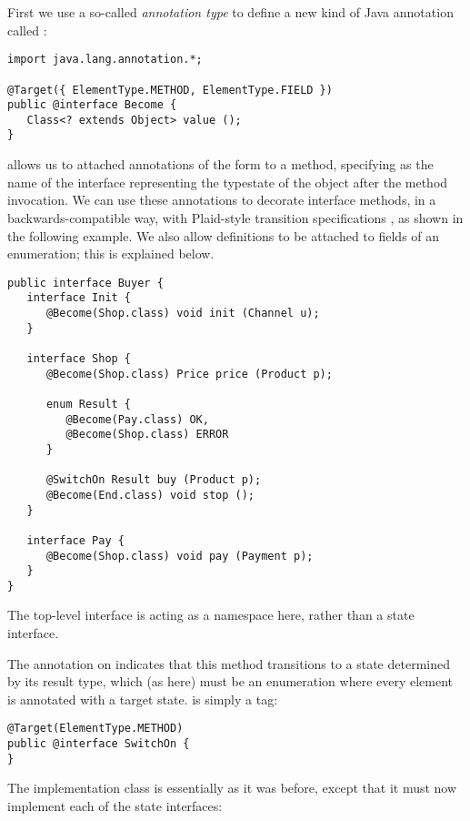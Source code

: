 First we use a so-called \emph{annotation type} to define a new kind
of Java annotation called :

\begin{lstlisting}
import java.lang.annotation.*;

@Target({ ElementType.METHOD, ElementType.FIELD })
public @interface Become {
   Class<? extends Object> value ();
}
\end{lstlisting}

\noindent {} allows us to attached annotations of the form
 to a method, specifying  as the
name of the interface representing the typestate of the object after
the method invocation. We can use these annotations to decorate
interface methods, in a backwards-compatible way, with Plaid-style
transition specifications \cite{garcia14}, as shown in the following
example. We also allow  definitions to be attached to
fields of an enumeration; this is explained below.

\begin{lstlisting}
public interface Buyer {
   interface Init {
      @Become(Shop.class) void init (Channel u);
   }

   interface Shop {
      @Become(Shop.class) Price price (Product p);

      enum Result {
         @Become(Pay.class) OK,
         @Become(Shop.class) ERROR
      }

      @SwitchOn Result buy (Product p);
      @Become(End.class) void stop ();
   }

   interface Pay {
      @Become(Shop.class) void pay (Payment p);
   }
}
\end{lstlisting}

\noindent The top-level  interface is acting as a
namespace here, rather than a state interface.

The  annotation on  indicates that this method
transitions to a state determined by its result type, which (as here)
must be an enumeration where every element is annotated with a target
state.  is simply a tag:
\begin{lstlisting}
@Target(ElementType.METHOD)
public @interface SwitchOn {
}
\end{lstlisting}

The implementation class  is essentially as it was
before, except that it must now implement each of the state
interfaces:

